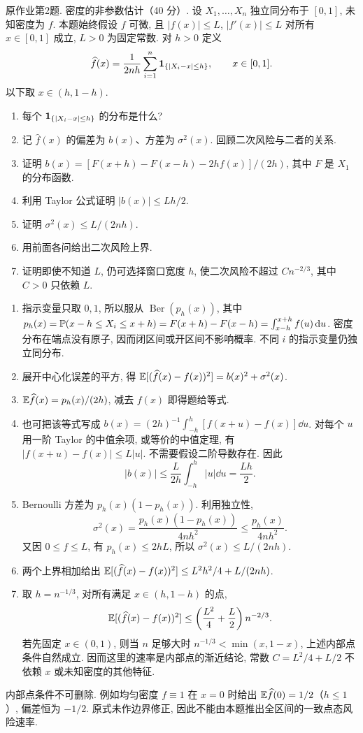 \begin{exercise}\label{ps09:p02}
原作业第2题. 密度的非参数估计（40 分）.
设 $X_1,\ldots,X_n$ 独立同分布于 $[0,1]$, 未知密度为 $f$. 本题始终假设 $f$ 可微, 且 $|f(x)|\le L$, $|f'(x)|\le L$ 对所有 $x\in[0,1]$ 成立, $L>0$ 为固定常数. 对 $h>0$ 定义
\[
\widehat f(x)=\frac1{2nh}\sum_{i=1}^n\mathbf 1_{\{|X_i-x|\le h\}},\qquad x\in[0,1].
\]
以下取 $x\in(h,1-h)$.
\begin{enumerate}[label=\arabic*.]
\item 每个 $\mathbf 1_{\{|X_i-x|\le h\}}$ 的分布是什么?
\item 记 $\widehat f(x)$ 的偏差为 $b(x)$、方差为 $\sigma^2(x)$. 回顾二次风险与二者的关系.
\item 证明 $b(x)=[F(x+h)-F(x-h)-2hf(x)]/(2h)$, 其中 $F$ 是 $X_1$ 的分布函数.
\item 利用 Taylor 公式证明 $|b(x)|\le Lh/2$.
\item 证明 $\sigma^2(x)\le L/(2nh)$.
\item 用前面各问给出二次风险上界.
\item 证明即使不知道 $L$, 仍可选择窗口宽度 $h$, 使二次风险不超过 $Cn^{-2/3}$, 其中 $C>0$ 只依赖 $L$.
\end{enumerate}
\end{exercise}
\begin{solution}
\begin{enumerate}[label=\arabic*.]
\item 指示变量只取 $0,1$, 所以服从 $\operatorname{Ber}(p_h(x))$, 其中 $p_h(x)=\mathbb P(x-h\le X_i\le x+h)=F(x+h)-F(x-h)=\int_{x-h}^{x+h}f(u)\,\mathrm d u$. 密度分布在端点没有原子, 因而闭区间或开区间不影响概率. 不同 $i$ 的指示变量仍独立同分布.
\item 展开中心化误差的平方, 得 $\mathbb E[(\widehat f(x)-f(x))^2]=b(x)^2+\sigma^2(x)$.
\item $\mathbb E\widehat f(x)=p_h(x)/(2h)$, 减去 $f(x)$ 即得题给等式.
\item 也可把该等式写成 $b(x)=(2h)^{-1}\int_{-h}^h[f(x+u)-f(x)]\dd u$. 对每个 $u$ 用一阶 Taylor 的中值余项, 或等价的中值定理, 有 $|f(x+u)-f(x)|\le L|u|$. 不需要假设二阶导数存在. 因此
\[
|b(x)|\le\frac{L}{2h}\int_{-h}^h|u|\dd u
=\frac{Lh}{2}.
\]
\item Bernoulli 方差为 $p_h(x)(1-p_h(x))$. 利用独立性,
\[
\sigma^2(x)=\frac{p_h(x)(1-p_h(x))}{4nh^2}
\le\frac{p_h(x)}{4nh^2}.
\]
又因 $0\le f\le L$, 有 $p_h(x)\le2hL$, 所以 $\sigma^2(x)\le L/(2nh)$.
\item 两个上界相加给出 $\mathbb E[(\widehat f(x)-f(x))^2]\le L^2h^2/4+L/(2nh)$.
\item 取 $h=n^{-1/3}$, 对所有满足 $x\in(h,1-h)$ 的点,
\[
\mathbb E[(\widehat f(x)-f(x))^2]\le
\left(\frac{L^2}{4}+\frac L2\right)n^{-2/3}.
\]
若先固定 $x\in(0,1)$, 则当 $n$ 足够大时 $n^{-1/3}<\min(x,1-x)$, 上述内部点条件自然成立. 因而这里的速率是内部点的渐近结论, 常数 $C=L^2/4+L/2$ 不依赖 $x$ 或未知密度的其他特征.
\end{enumerate}
\end{solution}
\begin{remark}
内部点条件不可删除. 例如均匀密度 $f\equiv1$ 在 $x=0$ 时给出 $\mathbb E\widehat f(0)=1/2$（$h\le1$）, 偏差恒为 $-1/2$. 原式未作边界修正, 因此不能由本题推出全区间的一致点态风险速率.
\end{remark}
